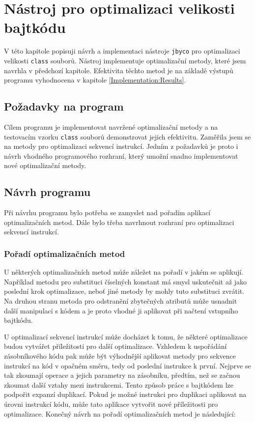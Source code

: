 \chapter{Nástroj pro optimalizaci velikosti bajtkódu}\label{Implementation}


V této kapitole popisuji návrh a implementaci nástroje \texttt{jbyco} pro optimalizaci velikosti \texttt{class} souborů. Nástroj implementuje optimalizační metody, které jsem navrhla v předchozí kapitole. Efektivita těchto metod je na základě výstupů programu vyhodnocena v kapitole \ref{Implementation:Results}.

\section{Požadavky na program}

Cílem programu je implementovat navržené optimalizační metody a na testovacím vzorku \texttt{class} souborů demonstrovat jejich efektivitu. Zaměřila jsem se na metody pro optimalizaci sekvencí instrukcí. Jedním z požadavků je proto i návrh vhodného programového rozhraní, který umožní snadno implementovat nové optimalizační metody.

\section{Návrh programu}

Při návrhu programu bylo potřeba se zamyslet nad pořadím aplikací optimalizačních metod. Dále bylo třeba navrhnout rozhraní pro optimalizaci sekvencí instrukcí.

\subsection{Pořadí optimalizačních metod}

U některých optimalizačních metod může záležet na pořadí v jakém se aplikují. Například metodu pro substituci číselných konstant má smysl uskutečnit až jako poslední krok optimalizace, neboť jiné metody by mohly tuto substituci zvrátit. Na druhou stranu metoda pro odstranění zbytečných atributů může usnadnit další manipulaci s  kódem a je proto vhodné ji aplikovat při načtení vstupního bajtkódu. 

U optimalizací sekvencí instrukcí může docházet k tomu, že některé optimalizace budou vytvářet příležitosti pro další optimalizace. Vzhledem k uspořádání zásobníkového kódu pak může být výhodnější aplikovat metody pro sekvence instrukcí na kód v opačném směru, tedy od poslední instrukce k první. Nejprve se tak zkoumají operace a jejich parametry na zásobníku, předtím, než se začnou zkoumat další vztahy mezi instrukcemi. Tento způsob práce s bajtkódem lze podpořit expanzí duplikací. Pokud je možné instrukci pro duplikaci aplikovat na úrovni instrukcí kódu, může tato aplikace vytvořit nové příležitosti pro optimalizace.
Konečný návrh na pořadí optimalizačních metod je následující:


